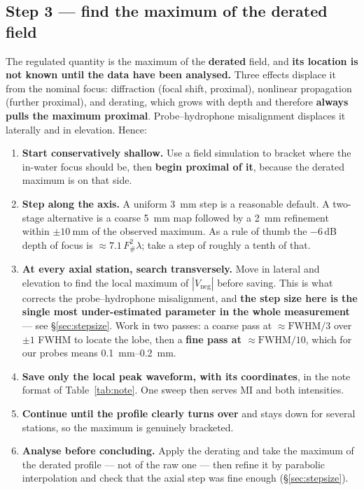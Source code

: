 \documentclass[11pt,a4paper]{article}
\newcommand{\good}[1]{\textcolor{green!45!black}{\textbf{#1}}}
\begin{document}
\subsection{Step 3 --- find the maximum of the derated field}\label{sec:axial}
The regulated quantity is the maximum of the \textbf{derated} field, and \good{its location is not
known until the data have been analysed.} Three effects displace it from the nominal focus:
diffraction (focal shift, proximal), nonlinear propagation (further proximal), and derating, which
grows with depth and therefore \textbf{always pulls the maximum proximal}. Probe--hydrophone
misalignment displaces it laterally and in elevation. Hence:

\begin{enumerate}
  \item \textbf{Start conservatively shallow.} Use a field simulation to bracket where the in-water
    focus should be, then \textbf{begin proximal of it}, because the derated maximum is on that side.
  \item \textbf{Step along the axis.} A uniform \SI{3}{\milli\metre} step is a reasonable default. A
    two-stage alternative is a coarse \SI{5}{\milli\metre} map followed by a \SI{2}{\milli\metre}
    refinement within $\pm\SI{10}{\milli\metre}$ of the observed maximum. As a rule of thumb the
    $-6$\,dB depth of focus is $\approx 7.1\,F_\#^2\lambda$; take a step of roughly a tenth of that.
  \item \textbf{At every axial station, search transversely.} Move in lateral and elevation to find
    the local maximum of $|V_\mathrm{neg}|$ before saving. This is what corrects the
    probe--hydrophone misalignment, and \good{the step size here is the single most
    under-estimated parameter in the whole measurement} --- see \S\ref{sec:stepsize}. Work in two
    passes: a coarse pass at $\approx\mathrm{FWHM}/3$ over $\pm1$ FWHM to locate the lobe, then a
    \textbf{fine pass at $\approx\mathrm{FWHM}/10$}, which for our probes means
    \SIrange{0.1}{0.2}{\milli\metre}.
  \item \textbf{Save only the local peak waveform, with its coordinates}, in the note format of
    Table~\ref{tab:note}. One sweep then serves MI and both intensities.
  \item \textbf{Continue until the profile clearly turns over} and stays down for several stations,
    so the maximum is genuinely bracketed.
  \item \textbf{Analyse before concluding.} Apply the derating and take the maximum of the derated
    profile --- not of the raw one --- then refine it by parabolic interpolation and check that the
    axial step was fine enough (\S\ref{sec:stepsize}).
\end{enumerate}
\end{document}

